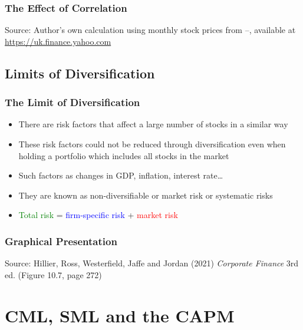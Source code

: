 \documentclass[9pt,aspectratio=169]{beamer}
\begin{document}
\begin{frame}
\frametitle{\textnormal{The Effect of Correlation}}

\begin{center}
    

    \tiny {Source: Author's own calculation using monthly stock prices from \LWindowFrom--\LWindowTo, available at \url{https://uk.finance.yahoo.com}}
\end{center}
\end{frame}

\subsection{Limits of Diversification}

\begin{frame}
\frametitle{\textnormal{The Limit of Diversification}}

\begin{itemize}
\item There are risk factors that affect a large number of stocks in a similar way
\item These risk factors could not be reduced through diversification even when holding a portfolio which includes all stocks in the market
\item Such factors as changes in GDP, inflation, interest rate…
\item They are known as non-diversifiable or market risk or systematic risks
\item \textcolor{green}{Total risk} = \textcolor{blue}{firm-specific risk} + \textcolor{red}{market risk}

\end{itemize}

\end{frame}

\begin{frame}
\frametitle{\textnormal{Graphical Presentation}}

\begin{center}



\tiny {Source: Hillier, Ross, Westerfield, Jaffe and Jordan (2021) \textit{Corporate Finance} 3rd ed. (Figure 10.7, page 272)}
\end{center}
\end{frame}

\section{CML, SML and the CAPM}
\end{document}

